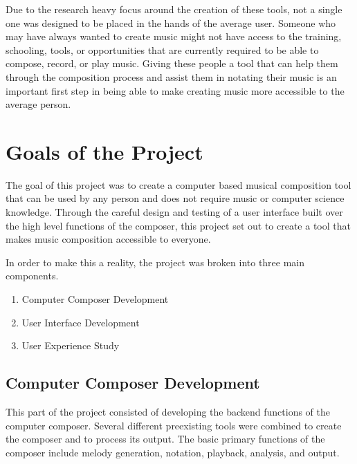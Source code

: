 \vspace{\baselineskip}

Due to the research heavy focus around the creation of these tools, not a single one was designed to be placed in the hands of the average user.  Someone who may have always wanted to create music might not have access to the training, schooling, tools, or opportunities that are currently required to be able to compose, record, or play music.  Giving these people a tool that can help them through the composition process and assist them in notating their music is an important first step in being able to make creating music more accessible to the average person.

\section{Goals of the Project}
\label{sec:goalsoftheproject}

The goal of this project was to create a computer based musical composition tool that can be used by any person and does not require music or computer science knowledge.  Through the careful design and testing of a user interface built over the high level functions of the composer, this project set out to create a tool that makes music composition accessible to everyone.

\vspace{\baselineskip}

In order to make this a reality, the project was broken into three main components.

\begin{enumerate}
	\item Computer Composer Development
	\item User Interface Development
	\item User Experience Study
\end{enumerate}

\subsection{Computer Composer Development}
\label{subsec:computercomposerdevelopment}

This part of the project consisted of developing the backend functions of the computer composer.  Several different preexisting tools were combined to create the composer and to process its output.  The basic primary functions of the composer include melody generation, notation, playback, analysis, and output.


